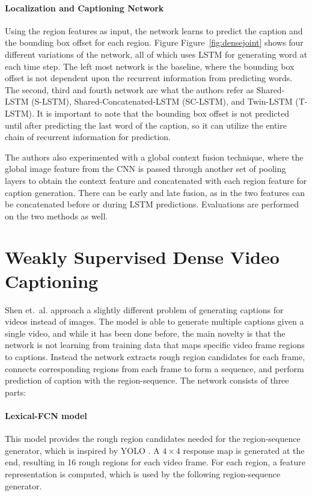 \documentclass[12pt,onecolumn,letterpaper,draftclsnofoot]{article}
\newcommand{\figref}[1]{Figure~\ref{fig:#1}}
\begin{document}
\paragraph{Localization and Captioning Network}
Using the region features as input, the network learns to predict the caption
and the bounding box offset for each region. Figure \figref{densejoint} shows
four different variations of the network, all of which uses LSTM for
generating word at each time step. The left most network is the baseline,
where the bounding box offset is not dependent upon the recurrent information
from predicting words. The second, third and fourth network are what the
authors refer as Shared-LSTM (S-LSTM), Shared-Concatenated-LSTM (SC-LSTM), and
Twin-LSTM (T-LSTM). It is important to note that the bounding box offset is
not predicted until after predicting the last word of the caption, so it can
utilize the entire chain of recurrent information for prediction.

The authors also experimented with a global context fusion technique, where
the global image feature from the CNN is passed through another set of pooling
layers to obtain the context feature and concatenated with each region feature
for caption generation. There can be early and late fusion, as in the two
features can be concatenated before or during LSTM predictions. Evaluations
are performed on the two methods as well.

\section{Weakly Supervised Dense Video Captioning}
Shen et.\ al.\cite{denseshen} approach a slightly different problem of
generating captions for videos instead of images. The model is able to
generate multiple captions given a single video, and while it has been done
before, the main novelty is that the network is not learning from training
data that maps specific video frame regions to captions. Instead the network
extracts rough region candidates for each frame, connects corresponding
regions from each frame to form a sequence, and perform prediction of caption
with the region-sequence. The network consists of three parts:

\paragraph{Lexical-FCN model}
This model provides the rough region candidates needed for the region-sequence
generator, which is inspired by YOLO \cite{yolo}. A $4\times4$ response map is
generated at the end, resulting in 16 rough regions for each video frame. For
each region, a feature representation is computed, which is used by the
following region-sequence generator.
\end{document}
